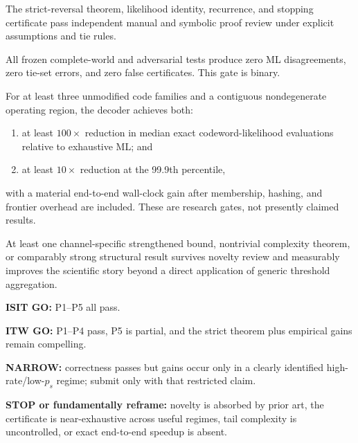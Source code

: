 \documentclass[11pt]{article}
\theoremstyle{definition}
\theoremstyle{remark}
\begin{document}
\begin{gatebox}
The strict-reversal theorem, likelihood identity, recurrence, and stopping certificate pass independent manual and symbolic proof review under explicit assumptions and tie rules.
\end{gatebox}

\begin{gatebox}
All frozen complete-world and adversarial tests produce zero ML disagreements, zero tie-set errors, and zero false certificates. This gate is binary.
\end{gatebox}

\begin{gatebox}
For at least three unmodified code families and a contiguous nondegenerate operating region, the decoder achieves both:
\begin{enumerate}
  \item at least $100\times$ reduction in median exact codeword-likelihood evaluations relative to exhaustive ML; and
  \item at least $10\times$ reduction at the 99.9th percentile,
\end{enumerate}
with a material end-to-end wall-clock gain after membership, hashing, and frontier overhead are included. These are research gates, not presently claimed results.
\end{gatebox}

\begin{gatebox}
At least one channel-specific strengthened bound, nontrivial complexity theorem, or comparably strong structural result survives novelty review and measurably improves the scientific story beyond a direct application of generic threshold aggregation.
\end{gatebox}

\begin{stopbox}
\textbf{ISIT GO:} P1--P5 all pass.\par
\textbf{ITW GO:} P1--P4 pass, P5 is partial, and the strict theorem plus empirical gains remain compelling.\par
\textbf{NARROW:} correctness passes but gains occur only in a clearly identified high-rate/low-$p_s$ regime; submit only with that restricted claim.\par
\textbf{STOP or fundamentally reframe:} novelty is absorbed by prior art, the certificate is near-exhaustive across useful regimes, tail complexity is uncontrolled, or exact end-to-end speedup is absent.
\end{stopbox}
\end{document}
